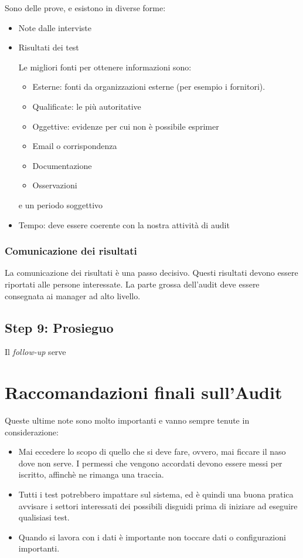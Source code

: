 Sono delle prove, e esistono in diverse forme:
\begin{itemize}
\item Note dalle interviste
\item Risultati dei test

Le migliori fonti per ottenere informazioni sono:
\begin{itemize}
\item Esterne: fonti da organizzazioni esterne (per esempio i fornitori).
\item Qualificate: le più autoritative
\item Oggettive: evidenze per cui non è possibile esprimer
\item Email o corrispondenza
\item Documentazione
\item Osservazioni
\end{itemize}e un periodo soggettivo
\item Tempo: deve essere coerente con la nostra attività di audit
\end{itemize}



\subsubsection{Comunicazione dei risultati}

La comunicazione dei risultati è una passo decisivo. Questi risultati devono
essere riportati alle persone interessate.
La parte grossa dell'audit deve essere consegnata ai manager ad alto
livello.


\subsection{Step 9: Prosieguo}


Il \textit{follow-up} serve 

\section{Raccomandazioni finali sull'Audit}

Queste ultime note sono molto importanti e vanno sempre tenute in
considerazione:
\begin{itemize}
\item Mai eccedere lo scopo di quello che si deve fare, ovvero, mai ficcare il
naso dove non serve. I permessi che vengono accordati devono essere messi per
iscritto, affinchè ne rimanga una traccia.
\item Tutti i test potrebbero impattare sul sistema, ed è quindi una buona
pratica avvisare i settori interessati dei possibili disguidi prima di iniziare
ad eseguire qualisiasi test.
\item Quando si lavora con i dati è importante non toccare dati o configurazioni
importanti.
\end{itemize}


